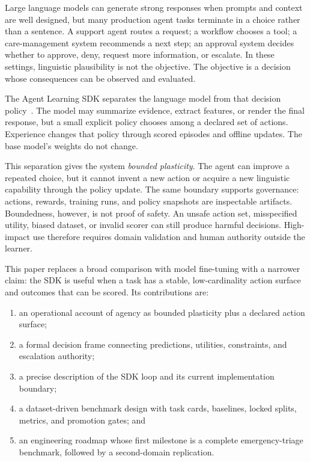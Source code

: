 \documentclass[conference]{IEEEtran}
\begin{document}
Large language models can generate strong responses when prompts and
context are well designed, but many production agent tasks terminate
in a choice rather than a sentence. A support agent routes a request;
a workflow chooses a tool; a care-management system recommends a next
step; an approval system decides whether to approve, deny, request
more information, or escalate. In these settings, linguistic
plausibility is not the objective. The objective is a decision whose
consequences can be observed and evaluated.

The Agent Learning SDK separates the language model from that
decision policy~\cite{agentlearningsdk2026}. The model may summarize
evidence, extract features, or render the final response, but a small
explicit policy chooses among a declared set of actions. Experience
changes that policy through scored episodes and offline updates. The
base model's weights do not change.

This separation gives the system \emph{bounded plasticity}. The
agent can improve a repeated choice, but it cannot invent a new action
or acquire a new linguistic capability through the policy update.
The same boundary supports governance: actions, rewards, training
runs, and policy snapshots are inspectable artifacts. Boundedness,
however, is not proof of safety. An unsafe action set, misspecified
utility, biased dataset, or invalid scorer can still produce harmful
decisions. High-impact use therefore requires domain validation and
human authority outside the learner.

This paper replaces a broad comparison with model fine-tuning with a
narrower claim: the SDK is useful when a task has a stable,
low-cardinality action surface and outcomes that can be scored. Its
contributions are:

\begin{enumerate}
\item an operational account of agency as bounded plasticity plus a
  declared action surface;
\item a formal decision frame connecting predictions, utilities,
  constraints, and escalation authority;
\item a precise description of the SDK loop and its current
  implementation boundary;
\item a dataset-driven benchmark design with task cards, baselines,
  locked splits, metrics, and promotion gates; and
\item an engineering roadmap whose first milestone is a complete
  emergency-triage benchmark, followed by a second-domain replication.
\end{enumerate}
\end{document}
